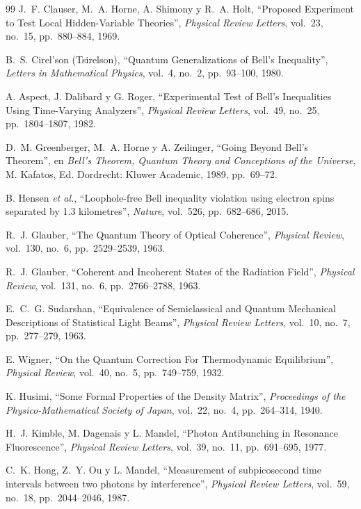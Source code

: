 \documentclass[11pt,a4paper,twoside]{report}
\theoremstyle{definition}
\theoremstyle{plain}
\theoremstyle{remark}
\begin{document}
\begin{thebibliography}{99}
J.~F. Clauser, M.~A. Horne, A. Shimony y R.~A. Holt, ``Proposed Experiment to Test Local Hidden-Variable Theories'', \textit{Physical Review Letters}, vol.~23, no.~15, pp.~880--884, 1969.

B.~S. Cirel'son (Tsirelson), ``Quantum Generalizations of Bell's Inequality'', \textit{Letters in Mathematical Physics}, vol.~4, no.~2, pp.~93--100, 1980.

A. Aspect, J. Dalibard y G. Roger, ``Experimental Test of Bell's Inequalities Using Time-Varying Analyzers'', \textit{Physical Review Letters}, vol.~49, no.~25, pp.~1804--1807, 1982.

D.~M. Greenberger, M.~A. Horne y A. Zeilinger, ``Going Beyond Bell's Theorem'', en \textit{Bell's Theorem, Quantum Theory and Conceptions of the Universe}, M. Kafatos, Ed. Dordrecht: Kluwer Academic, 1989, pp.~69--72.

B. Hensen \textit{et al.}, ``Loophole-free Bell inequality violation using electron spins separated by 1.3 kilometres'', \textit{Nature}, vol.~526, pp.~682--686, 2015.

R.~J. Glauber, ``The Quantum Theory of Optical Coherence'', \textit{Physical Review}, vol.~130, no.~6, pp.~2529--2539, 1963.

R.~J. Glauber, ``Coherent and Incoherent States of the Radiation Field'', \textit{Physical Review}, vol.~131, no.~6, pp.~2766--2788, 1963.

E.~C.~G. Sudarshan, ``Equivalence of Semiclassical and Quantum Mechanical Descriptions of Statistical Light Beams'', \textit{Physical Review Letters}, vol.~10, no.~7, pp.~277--279, 1963.

E. Wigner, ``On the Quantum Correction For Thermodynamic Equilibrium'', \textit{Physical Review}, vol.~40, no.~5, pp.~749--759, 1932.

K. Husimi, ``Some Formal Properties of the Density Matrix'', \textit{Proceedings of the Physico-Mathematical Society of Japan}, vol.~22, no.~4, pp.~264--314, 1940.

H.~J. Kimble, M. Dagenais y L. Mandel, ``Photon Antibunching in Resonance Fluorescence'', \textit{Physical Review Letters}, vol.~39, no.~11, pp.~691--695, 1977.

C.~K. Hong, Z.~Y. Ou y L. Mandel, ``Measurement of subpicosecond time intervals between two photons by interference'', \textit{Physical Review Letters}, vol.~59, no.~18, pp.~2044--2046, 1987.


\end{thebibliography}
\end{document}
